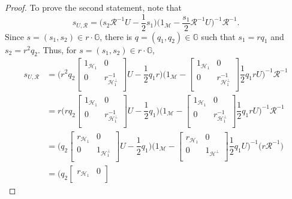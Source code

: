 \documentclass[12pt,reqno]{amsart}
\numberwithin{equation}{section}
\theoremstyle{definition}
\begin{document}
\begin{proof}
To prove the second statement, note that
$$
s_{U,\mathcal{R}} = \bigg(s_{2}\mathcal{R}^{-1}U-\dfrac{1}{2}s_{1}\bigg)\bigg(1_{\mathcal{M}}-\dfrac{s_{1}}{2}\mathcal{R}^{-1}U\bigg)^{-1}\mathcal{R}^{-1}.    
$$
Since $s=(s_{1},s_{2})\in r\cdot \mathbb{G}$, there is $q = (q_{1},q_{2}) \in \mathbb{G}$ such that $s_{1}=rq_1$ and $s_2 =r^2 q_2$.
 Thus, for $s=(s_{1},s_{2})\in r\cdot \mathbb{G}$,
\begin{align*}
s_{U,\mathcal{R}} & = \bigg( r^{2}q_{2} 
\begin{bmatrix}
	1_{\mathcal{H}_{1}} & 0 \\
	0 & r^{-1}_{\mathcal{H}_{1}^{\perp}} \\
\end{bmatrix}U-\dfrac{1}{2}q_{1}r\bigg)\bigg(1_{\mathcal{M}}-
\begin{bmatrix}
	1_{\mathcal{H}_{1}} & 0 \\
	0 & r^{-1}_{\mathcal{H}_{1}^{\perp}} \\
\end{bmatrix}\dfrac{1}{2}q_{1}rU\bigg)^{-1}\mathcal{R}^{-1} \\
& =r\bigg( rq_{2}\begin{bmatrix}
	1_{\mathcal{H}_{1}} & 0 \\
	0 & r^{-1}_{\mathcal{H}_{1}^{\perp}} \\
\end{bmatrix}U-\dfrac{1}{2}q_{1}\bigg)\bigg(1_{\mathcal{M}}-
\begin{bmatrix}
	1_{\mathcal{H}_{1}} & 0 \\
	0 & r^{-1}_{\mathcal{H}_{1}^{\perp}} \\
\end{bmatrix}\dfrac{1}{2}q_{1}rU\bigg)^{-1}\mathcal{R}^{-1} \\
& =\bigg( q_{2}\begin{bmatrix}
	r_{\mathcal{H}_{1}} & 0 \\
	0 & 1_{\mathcal{H}_{1}^{\perp}} \\
\end{bmatrix}U-\dfrac{1}{2}q_{1}\bigg)\bigg(1_{\mathcal{M}}-
\begin{bmatrix}
	r_{\mathcal{H}_{1}} & 0 \\
	0 & 1_{\mathcal{H}^{\perp}} \\
\end{bmatrix}\dfrac{1}{2}q_{1}U\bigg)^{-1}\bigg( r\mathcal{R}^{-1}\bigg) \\
& = \bigg( q_{2} 
\begin{bmatrix}
	r_{\mathcal{H}_{1}} & 0 \\

\end{bmatrix}
\end{align*}
\end{proof}
\end{document}
